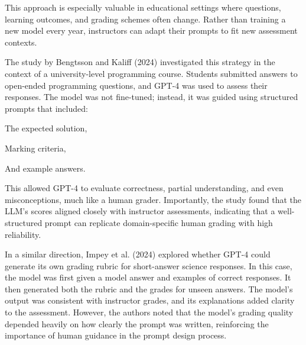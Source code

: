 \documentclass[a4paper,twoside,12pt]{report}
\begin{document}
This approach is especially valuable in educational settings where questions, learning outcomes, and grading schemes often change. Rather than training a new model every year, instructors can adapt their prompts to fit new assessment contexts.

The study by Bengtsson and Kaliff (2024) investigated this strategy in the context of a university-level programming course. Students submitted answers to open-ended programming questions, and GPT-4 was used to assess their responses. The model was not fine-tuned; instead, it was guided using structured prompts that included:
\begin{itemize}
  {\item The expected solution,
  \item Marking criteria,
  \item And example answers.}
\end{itemize}
This allowed GPT-4 to evaluate correctness, partial understanding, and even misconceptions, much like a human grader. Importantly, the study found that the LLM’s scores aligned closely with instructor assessments, indicating that a well-structured prompt can replicate domain-specific human grading with high reliability.

In a similar direction, Impey et al. (2024) explored whether GPT-4 could generate its own grading rubric for short-answer science responses. In this case, the model was first given a model answer and examples of correct responses. It then generated both the rubric and the grades for unseen answers. The model’s output was consistent with instructor grades, and its explanations added clarity to the assessment. However, the authors noted that the model’s grading quality depended heavily on how clearly the prompt was written, reinforcing the importance of human guidance in the prompt design process.
\end{document}

